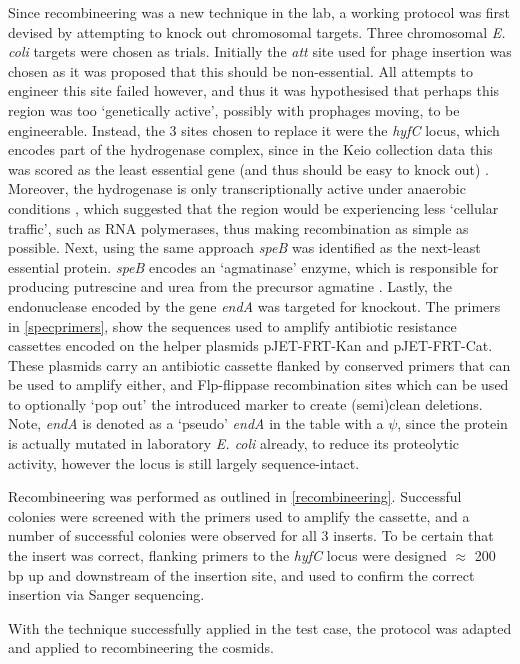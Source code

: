 Since recombineering was a new technique in the lab, a working protocol was first devised by attempting to knock out chromosomal targets. Three chromosomal \emph{E. coli} targets were chosen as trials. Initially the \emph{att} site used for phage insertion was chosen as it was proposed that this should be non-essential. All attempts to engineer this site failed however, and thus it was hypothesised that perhaps this region was too `genetically active', possibly with prophages moving, to be engineerable. Instead, the 3 sites chosen to replace it were the \emph{hyfC} locus, which encodes part of the hydrogenase complex, since in the Keio collection data this was scored as the least essential gene (and thus should be easy to knock out) \citep{Yu2000}. Moreover, the hydrogenase is only transcriptionally active under anaerobic conditions \citep{Skibinski2002}, which suggested that the region would be experiencing less `cellular traffic', such as RNA polymerases, thus making recombination as simple as possible. Next, using the same approach \emph{speB} was identified as the next-least essential protein. \emph{speB} encodes an `agmatinase' enzyme, which is responsible for producing putrescine and urea from the precursor agmatine \citep{Szumanski1990}. Lastly, the endonuclease encoded by the gene \emph{endA} was targeted for knockout. The primers in \vref{specprimers}, show the sequences used to amplify antibiotic resistance cassettes encoded on the helper plasmids pJET-FRT-Kan and pJET-FRT-Cat. These plasmids carry an antibiotic cassette flanked by conserved primers that can be used to amplify either, and Flp-flippase recombination sites which can be used to optionally `pop out' the introduced marker to create (semi)clean deletions. Note, \emph{endA} is denoted as a `pseudo' \emph{endA} in the table with a $\psi$, since the protein is actually mutated in laboratory \emph{E. coli} already, to reduce its proteolytic activity, however the locus is still largely sequence-intact.

Recombineering was performed as outlined in \vref{recombineering}. Successful colonies were screened with the primers used to amplify the cassette, and a number of successful colonies were observed for all 3 inserts. To be certain that the insert was correct, flanking primers to the \emph{hyfC} locus were designed $\approx$ 200 bp up and downstream of the insertion site, and used to confirm the correct insertion via Sanger sequencing.

With the technique successfully applied in the test case, the protocol was adapted and applied to recombineering the cosmids.


